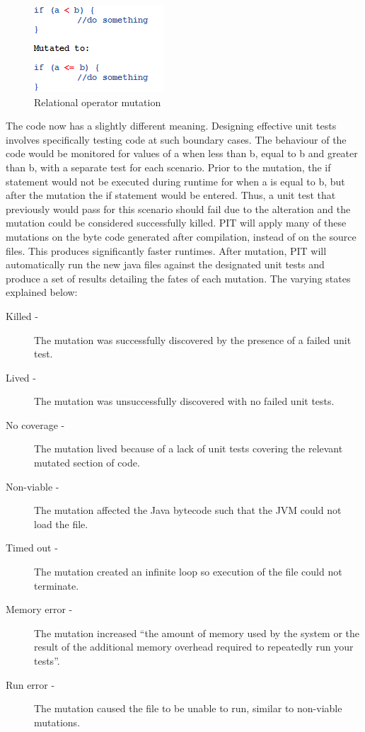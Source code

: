 \documentclass[a4paper,12pt]{article}
\begin{document}
\begin{figure}[h]
    \includegraphics{mutation.png}
    \caption{Relational operator mutation}
    \label{fig:mutation}
\end{figure}
    
The code now has a slightly different meaning. Designing effective unit tests involves specifically testing code at such boundary cases. The behaviour of the code would be monitored for values of a when less than b, equal to b and greater than b, with a separate test for each scenario. Prior to the mutation, the if statement would not be executed during runtime for when a is equal to b, but after the mutation the if statement would be entered. Thus, a unit test that previously would pass for this scenario should fail due to the alteration and the mutation could be considered successfully killed. PIT will apply many of these mutations on the byte code generated after compilation, instead of on the source files. This produces significantly faster runtimes. After mutation, PIT will automatically run the new java files against the designated unit tests and produce a set of results detailing the fates of each mutation. The varying states explained below:

\begin{description}
    \item[Killed - ]The mutation was successfully discovered by the presence of a failed unit test.
    \item[Lived -]The mutation was unsuccessfully discovered with no failed unit tests. 
    \item[No coverage -]The mutation lived because of a lack of unit tests covering the relevant mutated section of code. 
    \item[Non-viable -]The mutation affected the Java bytecode such that the JVM could not load the file.
    \item[Timed out -]The mutation created an infinite loop so execution of the file could not terminate. 
    \item[Memory error -]The mutation increased “the amount of memory used by the system or the result of the additional memory overhead required to repeatedly run your tests”.
    \item[Run error -]The mutation caused the file to be unable to run, similar to non-viable mutations.
\end{description}
\end{document}
